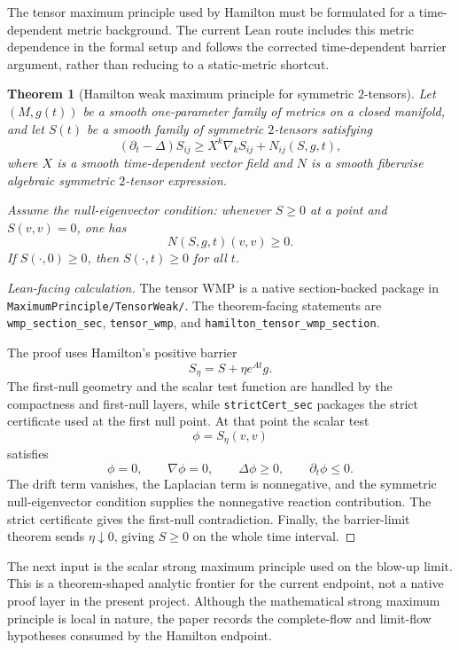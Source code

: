 \documentclass[11pt]{article}
\theoremstyle{plain}
\newtheorem{theorem}{Theorem}[section]
\theoremstyle{definition}
\theoremstyle{remark}
\newcommand{\leanref}[1]{\nolinkurl{#1}}
\newcommand{\leanfile}[1]{\nolinkurl{#1}}
\newcommand{\rfdir}[1]{\leanfile{#1/}}
\begin{document}
The tensor maximum principle used by Hamilton must be formulated for a
time-dependent metric background.  The current Lean route includes this
metric dependence in the formal setup and follows the corrected
time-dependent barrier argument, rather than reducing to a static-metric
shortcut.

\begin{theorem}[Hamilton weak maximum principle for symmetric $2$-tensors]
\label{thm:hamilton-tensor-wmp}
Let $(M,g(t))$ be a smooth one-parameter family of metrics on a closed
manifold, and let $S(t)$ be a smooth family of symmetric $2$-tensors satisfying
\[
(\partial_t-\Delta)S_{ij}
\ge
X^k\nabla_kS_{ij}+N_{ij}(S,g,t),
\]
where $X$ is a smooth time-dependent vector field and $N$ is a smooth
fiberwise algebraic symmetric $2$-tensor expression.

Assume the null-eigenvector condition: whenever $S\ge0$ at a point and
$S(v,v)=0$, one has
\[
N(S,g,t)(v,v)\ge0.
\]
If $S(\cdot,0)\ge0$, then $S(\cdot,t)\ge0$ for all $t$.
\end{theorem}

\begin{proof}[Lean-facing calculation]
The tensor WMP is a native section-backed package in
\rfdir{MaximumPrinciple/TensorWeak}.  The theorem-facing statements are
\leanref{wmp_section_sec}, \leanref{tensor_wmp}, and
\leanref{hamilton_tensor_wmp_section}.

The proof uses Hamilton's positive barrier
\[
  S_\eta=S+\eta e^{At}g.
\]
The first-null geometry and the scalar test function are handled by the
compactness and first-null layers, while \leanref{strictCert_sec} packages the
strict certificate used at the first null point.  At that point the scalar test
\[
  \phi=S_\eta(v,v)
\]
satisfies
\[
  \phi=0,
  \qquad
  \nabla\phi=0,
  \qquad
  \Delta\phi\ge0,
  \qquad
  \partial_t\phi\le0.
\]
The drift term vanishes, the Laplacian term is nonnegative, and the symmetric
null-eigenvector condition supplies the nonnegative reaction contribution.  The
strict certificate gives the first-null contradiction.  Finally, the
barrier-limit theorem sends $\eta\downarrow0$, giving $S\ge0$ on the whole time
interval.
\end{proof}

The next input is the scalar strong maximum principle used on the blow-up
limit.  This is a theorem-shaped analytic frontier for the current endpoint,
not a native proof layer in the present project.  Although the mathematical
strong maximum principle is local in nature, the paper records the
complete-flow and limit-flow hypotheses consumed by the Hamilton endpoint.
\end{document}
